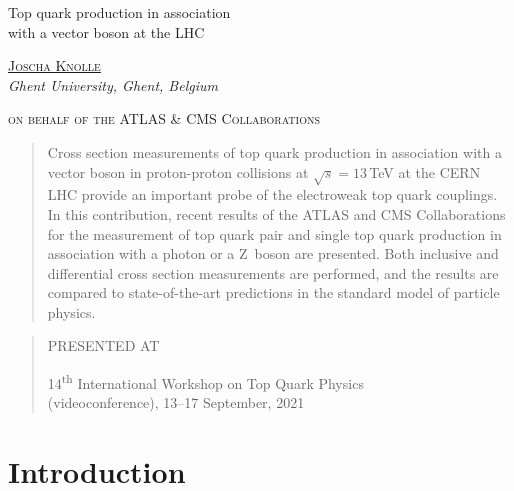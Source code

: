\documentclass[12pt]{article}
\newcommand{\TeV}{\,TeV\xspace}
\newcommand{\sqrts}[1][13]{$\sqrt{s}=#1$\TeV}
\begin{document}
\begin{titlepage}

\vfill
\begin{center}\Large %
    Top quark production in association\\ with a vector boson at the LHC
\end{center}
\vfill
\begin{center}
    \href{mailto:joscha.knolle@cern.ch}{\textsc{Joscha Knolle}} \\
    \textit{Ghent University, Ghent, Belgium}
\end{center}
\begin{center}
    \textsc{on behalf of the ATLAS \& CMS Collaborations}
\end{center}
\vfill
\begin{quotation} %
    Cross section measurements of top quark production in association with a vector boson in proton-proton collisions at \sqrts at the CERN LHC provide an important probe of the electroweak top quark couplings.
    In this contribution, recent results of the ATLAS and CMS Collaborations for the measurement of top quark pair and single top quark production in association with a photon or a Z~boson are presented.
    Both inclusive and differential cross section measurements are performed, and the results are compared to state-of-the-art predictions in the standard model of particle physics.
\end{quotation}
\vfill
\begin{quotation}\begin{center}
    PRESENTED AT
\end{center}\bigskip\begin{center}\large
    14\textsuperscript{th} International Workshop on Top Quark Physics\\
    (videoconference), 13--17 September, 2021
\end{center}\end{quotation}
\vfill
\end{titlepage}
\def\thefootnote{\fnsymbol{footnote}}
\setcounter{footnote}{0}


\section{Introduction}
\end{document}
